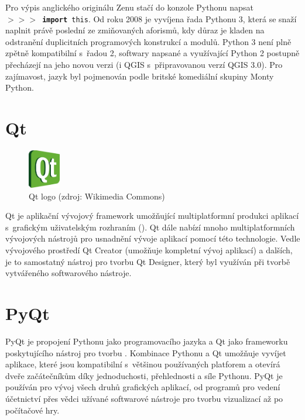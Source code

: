 Pro výpis anglického originálu Zenu stačí do konzole Pythonu napsat \\ \texttt{$>>>$~\textbf{import}~this}. Od roku 2008 je vyvíjena řada Pythonu 3, která se snaží naplnit právě poslední ze zmiňovaných aforismů, kdy důraz je kladen na odstranění duplicitních programových konstrukcí a modulů. Python 3 není plně zpětně kompatibilní s~řadou 2, softwary napsané a využívající Python 2 postupně přecházejí na jeho novou verzi (i QGIS s~připravovanou verzí QGIS 3.0). Pro zajímavost, jazyk byl pojmenován podle britské komediální skupiny Monty Python. \cite{pythonHistory}

\section{Qt}

\begin{figure}[H]
    \centering
      \includegraphics[width=40pt]{./pictures/qt.png}
      \caption[Qt logo]{Qt logo (zdroj: Wikimedia Commons)}
      \label{fig:python}
\end{figure}

Qt je aplikační vývojový framework umožňující multiplatformní produkci aplikací s~grafickým uživatelským rozhraním (). Qt dále nabízí mnoho multiplatformních vývojových nástrojů pro usnadnění vývoje aplikací pomocí této technologie. Vedle vývojového prostředí Qt Creator (umožňuje kompletní vývoj aplikací) a dalších, je to samostatný nástroj pro tvorbu  Qt Designer, který byl využíván při tvorbě vytvářeného softwarového nástroje. \cite{qt}

\section{PyQt}
PyQt je propojení Pythonu jako programovacího jazyka a Qt jako frameworku poskytujícího nástroj pro tvorbu . Kombinace Pythonu a Qt umožňuje vyvíjet aplikace, které jsou kompatibilní s~většinou používaných platforem a otevírá dveře začátečníkům díky jednoduchosti, přehlednosti a síle Pythonu. PyQt je používán pro vývoj všech druhů grafických aplikací, od programů pro vedení účetnictví přes vědci užívané softwarové nástroje pro tvorbu vizualizací až po počítačové hry. \cite{rapidPyQt}

